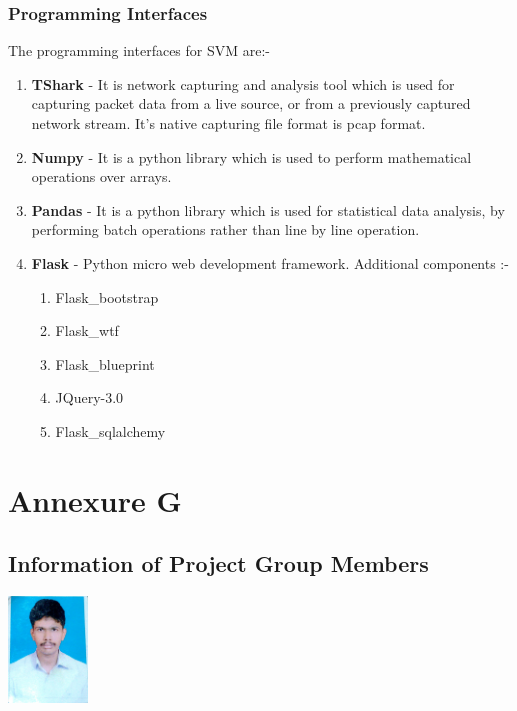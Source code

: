 \documentclass[12pt,a4paper,final]{report}
\DeclareRobustCommand{\gobblefive}[5]{}
\newcommand*{\SkipTocEntry}{\addtocontents{toc}{\gobblefive}}
\begin{document}
{{{{{\SkipTocEntry\subsection{Programming Interfaces}
The programming interfaces for SVM are:-
\begin{enumerate}
\item
\textbf{TShark} - It is network capturing and analysis tool which is used for capturing packet data from a live source, or from a previously captured network stream. It's native capturing file format is pcap format.
\item
\textbf{Numpy} - It is a python library which is used to perform mathematical operations over arrays.
\item
\textbf{Pandas} - It is a python library which is used for statistical data analysis, by performing batch operations rather than line by line operation.
\newpage
\item
\textbf{Flask} - Python micro web development framework.
\newline
Additional components :-
\begin{enumerate}
\item
Flask\_bootstrap

\item
Flask\_wtf

\item
Flask\_blueprint

\item
JQuery-3.0

\item
Flask\_sqlalchemy
\end{enumerate}
\end{enumerate}
\newpage

\SkipTocEntry\chapter{Annexure G}
\thispagestyle{empty}
\newpage
\SkipTocEntry\section{Information of Project Group Members}
\begin{flushright}
\includegraphics[width=60pt]{Achyuth.jpg}
\end{flushright}

}}}}}
\end{document}
